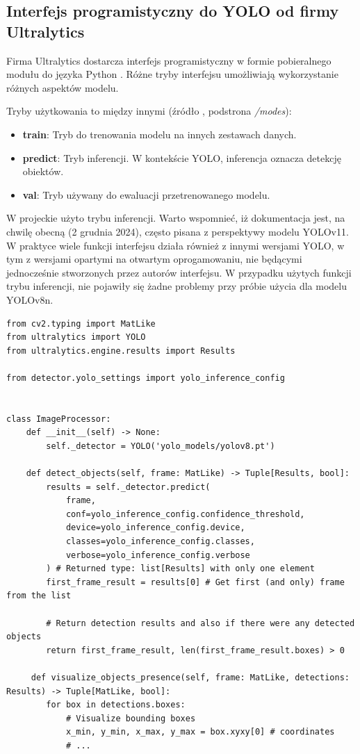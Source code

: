 \subsection{Interfejs programistyczny do YOLO od firmy Ultralytics}
\label{chap:wprowadzenie-yolo_interjes}
Firma Ultralytics dostarcza interfejs programistyczny w formie pobieralnego modułu do języka Python \cite{Python_docs}. Różne tryby interfejsu umożliwiają wykorzystanie różnych aspektów modelu. 

Tryby użytkowania to między innymi (źródło \cite{yolo_docs}, podstrona \emph{/modes}):
\begin{itemize}
    \item \textbf{train}: Tryb do trenowania modelu na innych zestawach danych.
    \item \textbf{predict}: Tryb inferencji. W kontekście YOLO, inferencja oznacza detekcję obiektów.
    \item \textbf{val}: Tryb używany do ewaluacji przetrenowanego modelu.
\end{itemize}

W projeckie użyto trybu inferencji. Warto wspomnieć, iż dokumentacja \cite{yolo_docs} jest, na chwilę obecną (2 grudnia 2024), często pisana z perspektywy modelu YOLOv11. W praktyce wiele funkcji interfejsu działa również z innymi wersjami YOLO, w tym z wersjami opartymi na otwartym oprogamowaniu, nie będącymi jednocześnie stworzonych przez autorów interfejsu. W przypadku użytych funkcji trybu inferencji, nie pojawiły się żadne problemy przy próbie użycia dla modelu YOLOv8n. 


\begin{lstlisting}[caption={Użycie trybu inferencji na przykładzie własnego kodu źródłowego.}, label={lst:inference_interface}]
from cv2.typing import MatLike
from ultralytics import YOLO
from ultralytics.engine.results import Results

from detector.yolo_settings import yolo_inference_config


class ImageProcessor:
    def __init__(self) -> None:
        self._detector = YOLO('yolo_models/yolov8.pt')

    def detect_objects(self, frame: MatLike) -> Tuple[Results, bool]:
        results = self._detector.predict(
            frame,
            conf=yolo_inference_config.confidence_threshold,
            device=yolo_inference_config.device,
            classes=yolo_inference_config.classes,
            verbose=yolo_inference_config.verbose
        ) # Returned type: list[Results] with only one element
        first_frame_result = results[0] # Get first (and only) frame from the list

        # Return detection results and also if there were any detected objects
        return first_frame_result, len(first_frame_result.boxes) > 0 

     def visualize_objects_presence(self, frame: MatLike, detections: Results) -> Tuple[MatLike, bool]:
        for box in detections.boxes:
            # Visualize bounding boxes
            x_min, y_min, x_max, y_max = box.xyxy[0] # coordinates
            # ...
\end{lstlisting}


